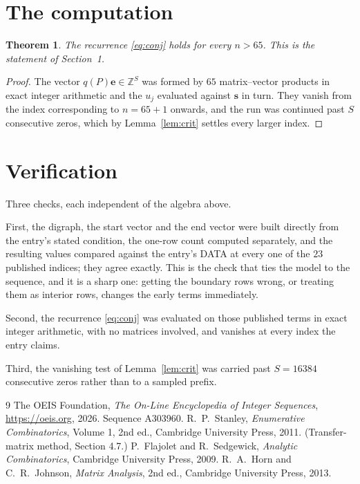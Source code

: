 \documentclass[11pt,a4paper]{article}
\theoremstyle{plain}
\newtheorem{theorem}{Theorem}
\theoremstyle{definition}
\begin{document}
\section{The computation}

\begin{theorem}
The recurrence \eqref{eq:conj} holds for every $n>65$. This is the statement of
Section~1.
\end{theorem}

\begin{proof}
The vector $q(P)\mathbf{e}\in\mathbb{Z}^{S}$ was formed by $65$ matrix--vector
products in exact integer arithmetic and the $u_j$ evaluated against $\mathbf{s}$ in turn.
They vanish from the index corresponding to $n=65+1$ onwards, and the run was continued
past $S$ consecutive zeros, which by Lemma~\ref{lem:crit} settles every larger index.
\end{proof}

\section{Verification}

Three checks, each independent of the algebra above.

First, the digraph, the start vector and the end vector were built directly from the
entry's stated condition, the one-row count computed separately, and the resulting values
compared against the entry's DATA at every one of the $23$ published indices; they
agree exactly. This is the check that ties the model to the sequence, and it is a sharp one:
getting the boundary rows wrong, or treating them as interior rows, changes the early terms
immediately.

Second, the recurrence \eqref{eq:conj} was evaluated on those published terms in exact
integer arithmetic, with no matrices involved, and vanishes at every index the entry claims.

Third, the vanishing test of Lemma~\ref{lem:crit} was carried past $S=16384$ consecutive
zeros rather than to a sampled prefix.

\begin{thebibliography}{9}
 The OEIS Foundation, \emph{The On-Line Encyclopedia of Integer
Sequences}, \url{https://oeis.org}, 2026. Sequence A303960.
 R.~P.~Stanley, \emph{Enumerative Combinatorics}, Volume 1, 2nd ed.,
Cambridge University Press, 2011. (Transfer-matrix method, Section 4.7.)
 P.~Flajolet and R.~Sedgewick, \emph{Analytic Combinatorics}, Cambridge
University Press, 2009.
 R.~A.~Horn and C.~R.~Johnson, \emph{Matrix Analysis}, 2nd ed., Cambridge
University Press, 2013.
\end{thebibliography}
\end{document}
